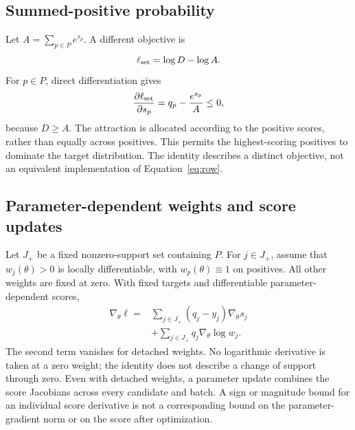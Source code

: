 \subsection{Summed-positive probability}
Let $A=\sum_{p\in P}e^{s_p}$. A different objective is
\begin{equation}
\ell_{\rm set}=\log D-\log A.
\end{equation}
For $p\in P$, direct differentiation gives
\begin{equation}
\frac{\partial\ell_{\rm set}}{\partial s_p}=q_p-\frac{e^{s_p}}{A}\leq0,
\end{equation}
because $D\geq A$. The attraction is allocated according to the positive scores, rather than equally across positives. This permits the highest-scoring positives to dominate the target distribution. The identity describes a distinct objective, not an equivalent implementation of Equation~\ref{eq:row}.

\subsection{Parameter-dependent weights and score updates}
Let $J_+$ be a fixed nonzero-support set containing $P$. For $j\in J_+$, assume that $w_j(\theta)>0$ is locally differentiable, with $w_p(\theta)\equiv1$ on positives. All other weights are fixed at zero. With fixed targets and differentiable parameter-dependent scores,
\begin{align}
\nabla_\theta\ell
={}&\sum_{j\in J_+}(q_j-y_j)\nabla_\theta s_j\nonumber\\
&+\sum_{j\in J_+}q_j\nabla_\theta\log w_j.
\end{align}
The second term vanishes for detached weights. No logarithmic derivative is taken at a zero weight; the identity does not describe a change of support through zero. Even with detached weights, a parameter update combines the score Jacobians across every candidate and batch. A sign or magnitude bound for an individual score derivative is not a corresponding bound on the parameter-gradient norm or on the score after optimization.

